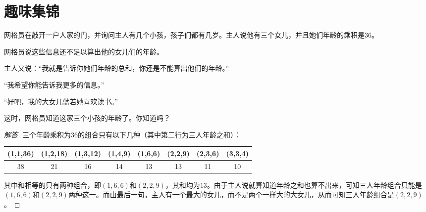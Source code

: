 
\chapter{趣味集锦}
\label{chap:fun}

\begin{example}[户口调查员]
  网格员在敲开一户人家的门，并询问主人有几个小孩，孩子们都有几岁。主人说他有三个女儿，并且她们年龄的乘积是$36$。

  网格员说这些信息还不足以算出他的女儿们的年龄。

  主人又说：“我就是告诉你她们年龄的总和，你还是不能算出他们的年龄。”

  “我希望你能告诉我更多的信息。”

  “好吧，我的大女儿蓝若她喜欢读书。”

  这时，网格员知道这家三个小孩的年龄了。你知道吗？
\end{example}
\begin{proof}[解答]
  三个年龄乘积为$36$的组合只有以下几种（其中第二行为三人年龄之和）：

\begin{center}
\begin{tabular}{cccccccc}
  \hline
  (1,1,36) & (1,2,18) & (1,3,12) & (1,4,9) & (1,6,6) & (2,2,9) & (2,3,6) & (3,3,4)\\
  \hline
  38       & 21       & 16       & 14      & 13      & 13      & 11      & 10\\
  \hline
\end{tabular}
\end{center}

其中和相等的只有两种组合，即$(1,6,6)$和$(2,2,9)$，其和均为$13$。由于主人说就算知道年龄之和也算不出来，可知三人年龄组合只能是$(1,6,6)$和$(2,2,9)$两种这一。而由最后一句，主人有一个最大的女儿，而不是两个一样大的大女儿，从而可知三人年龄组合是$(2,2,9)$。
\end{proof}

